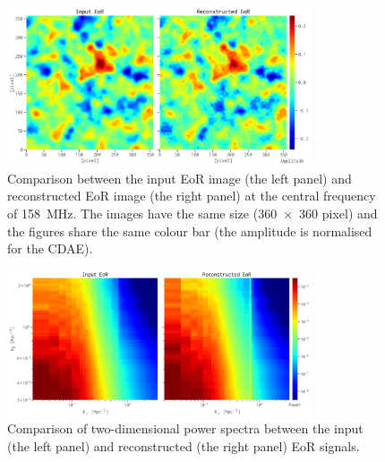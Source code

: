 \documentclass[fleqn,usenatbib]{mnras}
\newcommand{\editone}[1]{{\leavevmode\color{cyan}#1}}
\begin{document}
\begin{figure}
  \centering
  \includegraphics[width=0.8\textwidth]{eor-img-comp}
  \caption{\label{fig:eor-img}\editone{%
    Comparison between the input EoR image (the left panel) and
    reconstructed EoR image (the right panel) at the central frequency of
    \SI{158}{\MHz}.
    The images have the same size (\num{360 x 360} pixel) and the figures
    share the same colour bar (the amplitude is normalised for the CDAE).
  }}
\end{figure}

\begin{figure}
  \centering
  \includegraphics[width=0.8\textwidth]{eor-ps-comp}
  \caption{\label{fig:eor-ps}\editone{%
    Comparison of two-dimensional power spectra between the input (the left
    panel) and reconstructed (the right panel) EoR signals.
  }}
\end{figure}
\end{document}

